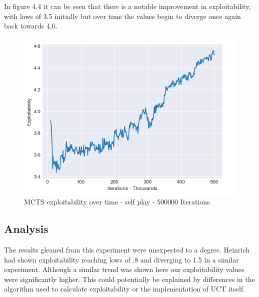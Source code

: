 In figure 4.4 it can be seen that there is a notable improvement in exploitability, with lows of 3.5 initially
but over time the values begin to diverge once again back towards 4.6.

\begin{figure}[ht]
    \includegraphics[scale=.7]{images/exploitability_self-play_deterministic_500000.png}
    \caption{MCTS exploitability over time - self play - 500000 Iterations}
\end{figure}

\subsection{Analysis}\label{subsec:analysis2}
The results gleaned from this experiment were unexpected to a degree.
Heinrich had shown exploitability reaching lows of .8 and diverging to 1.5 in a similar experiment.
Although a similar trend was shown here our exploitability values were significantly higher.
This could potentially be explained by differences in the algorithm used to calculate exploitability
or the implementation of UCT itself.

